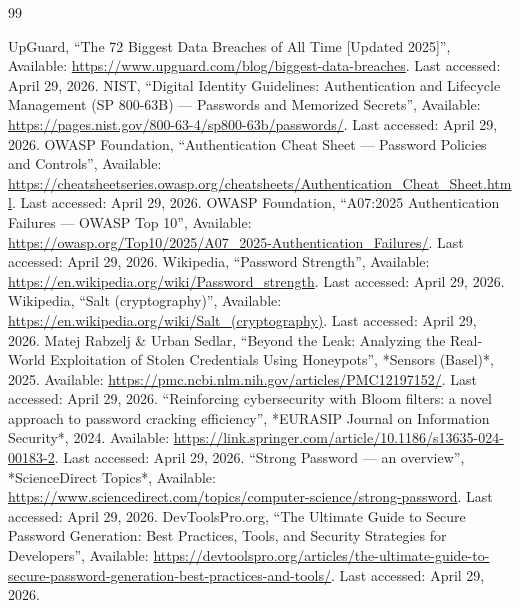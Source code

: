 \documentclass[english,12pt,twoside,a4paper]{report}
\begin{document}



\newpage

\newpage

\newpage

\newpage

\newpage

\begin{thebibliography}{99} 

 UpGuard, “The 72 Biggest Data Breaches of All Time [Updated 2025]”, Available: \url{https://www.upguard.com/blog/biggest-data-breaches}. Last accessed: April 29, 2026.
 NIST, “Digital Identity Guidelines: Authentication and Lifecycle Management (SP 800-63B) — Passwords and Memorized Secrets”, Available: \url{https://pages.nist.gov/800-63-4/sp800-63b/passwords/}. Last accessed: April 29, 2026.
 OWASP Foundation, “Authentication Cheat Sheet — Password Policies and Controls”, Available: \url{https://cheatsheetseries.owasp.org/cheatsheets/Authentication_Cheat_Sheet.html}. Last accessed: April 29, 2026.
 OWASP Foundation, “A07:2025 Authentication Failures — OWASP Top 10”, Available: \url{https://owasp.org/Top10/2025/A07_2025-Authentication_Failures/}. Last accessed: April 29, 2026.
 Wikipedia, “Password Strength”, Available: \url{https://en.wikipedia.org/wiki/Password_strength}. Last accessed: April 29, 2026.
 Wikipedia, “Salt (cryptography)”, Available: \url{https://en.wikipedia.org/wiki/Salt_(cryptography)}. Last accessed: April 29, 2026.
 Matej Rabzelj \& Urban Sedlar, “Beyond the Leak: Analyzing the Real-World Exploitation of Stolen Credentials Using Honeypots”, *Sensors (Basel)*, 2025. Available: \url{https://pmc.ncbi.nlm.nih.gov/articles/PMC12197152/}. Last accessed: April 29, 2026.
 “Reinforcing cybersecurity with Bloom filters: a novel approach to password cracking efficiency”, *EURASIP Journal on Information Security*, 2024. Available: \url{https://link.springer.com/article/10.1186/s13635-024-00183-2}. Last accessed: April 29, 2026.
 “Strong Password — an overview”, *ScienceDirect Topics*, Available: \url{https://www.sciencedirect.com/topics/computer-science/strong-password}. Last accessed: April 29, 2026.
 DevToolsPro.org, “The Ultimate Guide to Secure Password Generation: Best Practices, Tools, and Security Strategies for Developers”, Available: \url{https://devtoolspro.org/articles/the-ultimate-guide-to-secure-password-generation-best-practices-and-tools/}. Last accessed: April 29, 2026.

\end{thebibliography}
\end{document}
